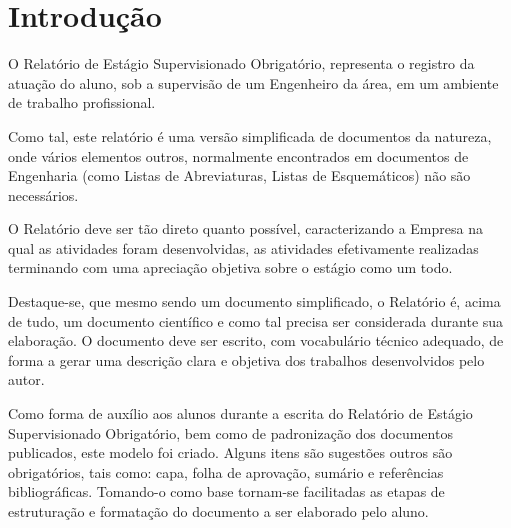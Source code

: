 \documentclass[repeatfields,xlists,xpacks,oneside,yearsonly]{ufrgscca}
\begin{document}



\tableofcontents



\chapter{Introdução}

O Relatório de Estágio Supervisionado Obrigatório,  representa o registro da atuação do aluno, sob a supervisão de um Engenheiro da área, em um ambiente de trabalho profissional.

Como tal, este relatório é uma versão simplificada de documentos da natureza, onde vários elementos outros, normalmente encontrados em documentos de Engenharia (como Listas de Abreviaturas, Listas de Esquemáticos) não são necessários.

O Relatório deve ser tão direto quanto possível, caracterizando a Empresa na qual as atividades foram desenvolvidas, as atividades efetivamente realizadas terminando com uma apreciação objetiva sobre o estágio como um todo.

Destaque-se, que mesmo sendo um documento simplificado, o Relatório é,
acima de tudo, um documento científico e como tal precisa ser considerada
durante sua elaboração. O documento deve ser escrito, com vocabulário
técnico adequado, de forma a gerar uma descrição clara e objetiva dos
trabalhos desenvolvidos pelo autor.

Como forma de auxílio aos alunos durante a escrita do Relatório de Estágio Supervisionado Obrigatório, bem como de padronização dos documentos publicados, este modelo foi criado. Alguns itens são sugestões outros são
obrigatórios, tais como: capa, folha de aprovação, sumário
e referências bibliográficas. Tomando-o como base tornam-se facilitadas as
etapas de estruturação e formatação do documento a ser elaborado pelo aluno.
\end{document}
